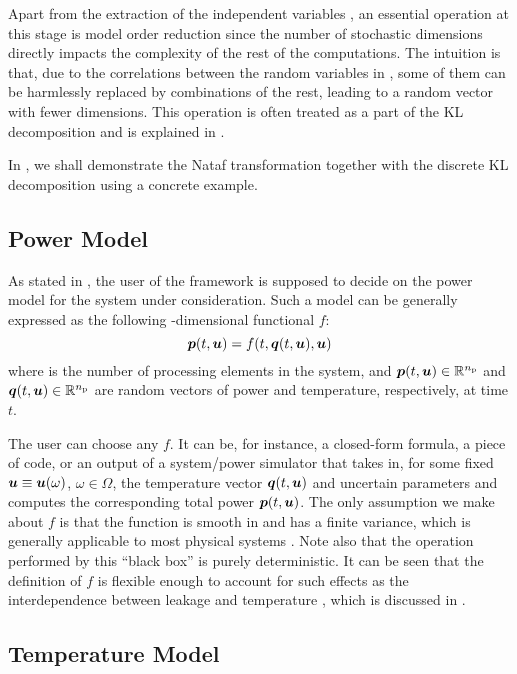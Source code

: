 Apart from the extraction of the independent variables \vz, an essential
operation at this stage is model order reduction since the number of stochastic
dimensions directly impacts the complexity of the rest of the computations. The
intuition is that, due to the correlations between the random variables in \vu,
some of them can be harmlessly replaced by combinations of the rest, leading to
a random vector \vz with fewer dimensions. This operation is often treated as a
part of the \ac{KL} decomposition and is explained in
.

In , we shall demonstrate the Nataf transformation together
with the discrete \ac{KL} decomposition using a concrete example.

\subsection{Power Model}

As stated in , the user of the framework is supposed
to decide on the power model for the system under consideration. Such a model
can be generally expressed as the following \np-dimensional functional $f$:
\begin{equation} \elab{power-model}
  \vp(t, \vu) = f(t, \vq(t, \vu), \vu)
\end{equation}
where \np is the number of processing elements in the system, and $\boldsymbol{p}(t, \boldsymbol{u})
\in \mathbb{R}^{n_\mathrm{p}}$ and $\boldsymbol{q}(t, \boldsymbol{u}) \in \mathbb{R}^{n_\mathrm{p}}$ are random vectors of power and
temperature, respectively, at time $t$.

The user can choose any $f$. It can be, for instance, a closed-form formula, a
piece of code, or an output of a system/power simulator that takes in, for some
fixed $\boldsymbol{u} \equiv \boldsymbol{u}(\omega)$, $\omega \in \Omega$, the temperature vector
$\boldsymbol{q}(t, \boldsymbol{u})$ and uncertain parameters \vu and computes the corresponding total
power $\boldsymbol{p}(t, \boldsymbol{u})$. The only assumption we make about $f$ is that the function
is smooth in \vz and has a finite variance, which is generally applicable to
most physical systems \cite{xiu2010}. Note also that the operation performed by
this ``black box'' is purely deterministic. It can be seen that the definition
of $f$ is flexible enough to account for such effects as the interdependence
between leakage and temperature \cite{srivastava2010, liu2007}, which is
discussed in .

\subsection{Temperature Model}

